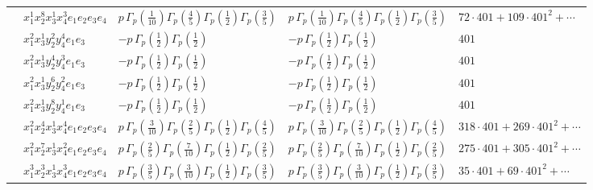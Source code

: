 \documentclass[11pt]{article}
\begin{document}
\begin{table}[ht]
{\begin{tabular}{@{}lllll@{}}
 & $x_{1}^{1} x_{2}^{8} x_{3}^{1} x_{4}^{3}  e_{1} e_{2} e_{3} e_{4}$ & $p \, \Gamma_p \left( \frac{1}{10} \right) \Gamma_p \left( \frac{4}{5} \right) \Gamma_p \left( \frac{1}{2} \right) \Gamma_p \left( \frac{3}{5} \right)$ & $p \, \Gamma_p \left( \frac{1}{10} \right) \Gamma_p \left( \frac{4}{5} \right) \Gamma_p \left( \frac{1}{2} \right) \Gamma_p \left( \frac{3}{5} \right)$ & $72{\cdot}401{+}109{\cdot}401^{2}{+}\cdots$ \\
 & $x_{1}^{2} x_{3}^{1} y_{2}^{2} y_{4}^{4} e_{1} e_{3}$ & $- p \, \Gamma_p \left( \frac{1}{2} \right) \Gamma_p \left( \frac{1}{2} \right)$ & $- p \, \Gamma_p \left( \frac{1}{2} \right) \Gamma_p \left( \frac{1}{2} \right)$ & $401$ \\
 & $x_{1}^{2} x_{3}^{1} y_{2}^{4} y_{4}^{3} e_{1} e_{3}$ & $- p \, \Gamma_p \left( \frac{1}{2} \right) \Gamma_p \left( \frac{1}{2} \right)$ & $- p \, \Gamma_p \left( \frac{1}{2} \right) \Gamma_p \left( \frac{1}{2} \right)$ & $401$ \\
 & $x_{1}^{2} x_{3}^{1} y_{2}^{6} y_{4}^{2} e_{1} e_{3}$ & $- p \, \Gamma_p \left( \frac{1}{2} \right) \Gamma_p \left( \frac{1}{2} \right)$ & $- p \, \Gamma_p \left( \frac{1}{2} \right) \Gamma_p \left( \frac{1}{2} \right)$ & $401$ \\
 & $x_{1}^{2} x_{3}^{1} y_{2}^{8} y_{4}^{1} e_{1} e_{3}$ & $- p \, \Gamma_p \left( \frac{1}{2} \right) \Gamma_p \left( \frac{1}{2} \right)$ & $- p \, \Gamma_p \left( \frac{1}{2} \right) \Gamma_p \left( \frac{1}{2} \right)$ & $401$ \\
 & $x_{1}^{2} x_{2}^{4} x_{3}^{1} x_{4}^{4}  e_{1} e_{2} e_{3} e_{4}$ & $p \, \Gamma_p \left( \frac{3}{10} \right) \Gamma_p \left( \frac{2}{5} \right) \Gamma_p \left( \frac{1}{2} \right) \Gamma_p \left( \frac{4}{5} \right)$ & $p \, \Gamma_p \left( \frac{3}{10} \right) \Gamma_p \left( \frac{2}{5} \right) \Gamma_p \left( \frac{1}{2} \right) \Gamma_p \left( \frac{4}{5} \right)$ & $318{\cdot}401{+}269{\cdot}401^{2}{+}\cdots$ \\
 & $x_{1}^{2} x_{2}^{7} x_{3}^{1} x_{4}^{2}  e_{1} e_{2} e_{3} e_{4}$ & $p \, \Gamma_p \left( \frac{2}{5} \right) \Gamma_p \left( \frac{7}{10} \right) \Gamma_p \left( \frac{1}{2} \right) \Gamma_p \left( \frac{2}{5} \right)$ & $p \, \Gamma_p \left( \frac{2}{5} \right) \Gamma_p \left( \frac{7}{10} \right) \Gamma_p \left( \frac{1}{2} \right) \Gamma_p \left( \frac{2}{5} \right)$ & $275{\cdot}401{+}305{\cdot}401^{2}{+}\cdots$ \\
 & $x_{1}^{3} x_{2}^{3} x_{3}^{1} x_{4}^{3}  e_{1} e_{2} e_{3} e_{4}$ & $p \, \Gamma_p \left( \frac{3}{5} \right) \Gamma_p \left( \frac{3}{10} \right) \Gamma_p \left( \frac{1}{2} \right) \Gamma_p \left( \frac{3}{5} \right)$ & $p \, \Gamma_p \left( \frac{3}{5} \right) \Gamma_p \left( \frac{3}{10} \right) \Gamma_p \left( \frac{1}{2} \right) \Gamma_p \left( \frac{3}{5} \right)$ & $35{\cdot}401{+}69{\cdot}401^{2}{+}\cdots$ \\

\end{tabular}}
\end{table}
\end{document}
